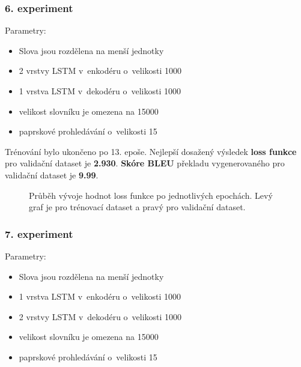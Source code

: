 \subsubsection{6. experiment}\label{experiment6}
Parametry:
\begin{itemize}
  \item Slova jsou rozdělena na menší jednotky
  \item 2 vrstvy LSTM v~enkodéru o~velikosti 1000
  \item 1 vrstva LSTM v~dekodéru o~velikosti 1000
  \item velikost slovníku je omezena na 15000
  \item paprskové prohledávání o~velikosti 15
\end{itemize}

Trénování bylo ukončeno po 13. epoše. Nejlepší dosažený výsledek \textbf{loss funkce} pro validační dataset je \textbf{2.930}. \textbf{Skóre BLEU} překladu vygenerovaného pro validační dataset je \textbf{9.99}.

\begin{figure}[H]
    \begin{center}
    \end{center}
	\caption{Průběh vývoje hodnot loss funkce po jednotlivých epochách. Levý graf je pro trénovací dataset a pravý pro validační dataset.}
\end{figure}


\subsubsection{7. experiment}\label{experiment7}
Parametry:
\begin{itemize}
  \item Slova jsou rozdělena na menší jednotky
  \item 1 vrstva LSTM v~enkodéru o~velikosti 1000
  \item 2 vrstvy LSTM v~dekodéru o~velikosti 1000
  \item velikost slovníku je omezena na 15000
  \item paprskové prohledávání o~velikosti 15
\end{itemize}

